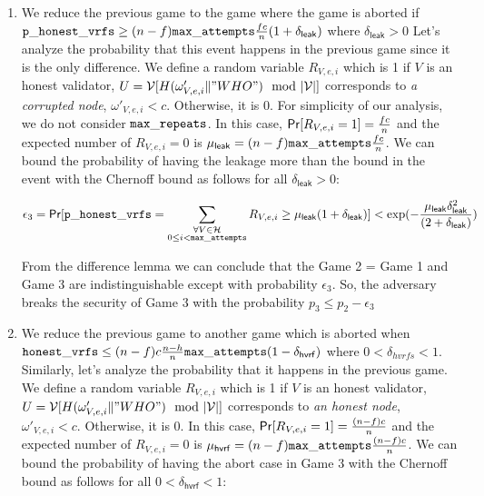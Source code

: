 \begin{enumerate}[label={{Game }}{{\arabic*}}]
	\item We reduce the previous game to the game where the game is aborted if $ \mathtt{p\_honest\_vrfs} \geq  (n-f)\mathtt{max\_attempts} \frac{fc}{n} (1+\delta_{\mathsf{leak}})  $ where  $ \delta_{\mathsf{leak}} > 0 $  Let's analyze the probability that this event happens in the previous game since it is the only difference. We define a random variable $ R_{V,e,i} $ which is 1 if $ V $ is an honest validator, $ U = \mathcal{V}[H(\omega'_{V,e,i} \| "WHO") \mod |\mathcal{V}|]  $ corresponds to \emph{a corrupted node}, $ \omega'_{V,e,i} < c $. Otherwise, it is 0. For simplicity of our analysis, we do not consider $ \mathtt{max\_repeats} $. In this case, $ \mathsf{Pr}[R_{V,e,i} = 1] = \frac{fc}{n}$ and
	the expected number of $ R_{V,e,i}  = 0$ is  $ \mu_{\mathsf{leak}} = (n-f) \mathtt{max\_attempts} \frac{fc}{n} $. We can bound the probability of having the leakage more than the bound in the event with the Chernoff bound as follows for all $ \delta_{\mathsf{leak}} > 0 	 $:
	
	\begin{equation}\label{eq:beforeepcoh}
	\epsilon_3 = \mathsf{Pr}[ \mathtt{p\_honest\_vrfs} = \sum_{\substack{ \forall V \in \mathcal{H} \\0\leq i < \mathtt{max\_attempts}}} R_{V,e,i} \geq \mu_{\mathsf{leak}} (1+ \delta_{\mathsf{leak}})] < \exp(-\frac{\mu_{\mathsf{leak}}\delta_{\mathsf{leak}}^2}{(2+\delta_{\mathsf{leak}})}) \nonumber
	\end{equation}
	
	From the difference lemma we can conclude that the Game 2 = Game 1 and Game 3 are indistinguishable except with probability $ \epsilon_3 $. So, the adversary breaks the security of Game 3 with the probability $ p_3 \leq  p_2 - \epsilon_3 $
	
	
	\item We reduce the previous game to another game which is aborted when $ \mathtt{honest\_vrfs} \leq (n-f)c \frac{n-h}{n} \mathtt{max\_attempts} (1- \delta_{\mathsf{hvrf}}) $ where $ 0 < \delta_{hvrfs} < 1 $. Similarly, let's analyze the probability that it happens in the previous game. We define a random variable $ R_{V,e,i} $ which is 1 if $ V $ is an honest validator, $ U = \mathcal{V}[H(\omega'_{V,e,i} \| "WHO") \mod |\mathcal{V}|]  $ corresponds to  \emph{an honest node}, $ \omega'_{V,e,i} < c $. Otherwise, it is 0.  In this case, $ \mathsf{Pr}[R_{V,e,i} = 1] = \frac{(n-f)c}{n}$ and
	the expected number of $ R_{V,e,i}  = 0$ is  $ \mu_{\mathsf{hvrf}} = (n-f) \mathtt{max\_attempts} \frac{(n-f)c}{n} $. We can bound the probability of having the abort case in Game 3 with the Chernoff bound as follows for all $ 0 <\delta_{\mathsf{hvrf}} < 1 	 $:
	

\end{enumerate}
